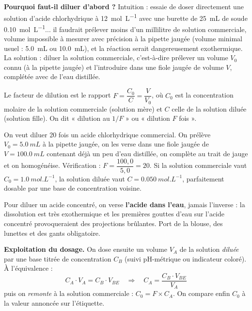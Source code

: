 \documentclass[11pt]{article}
\newcommand{\cle}[1]{{\popxbold\color{popdark}#1}}
\begin{document}
\textbf{Pourquoi faut-il diluer d'abord ?} Intuition : essaie de doser directement une solution d'acide chlorhydrique à \SI{12}{mol.L^{-1}} avec une burette de \SI{25}{mL} de soude \SI{0,10}{mol.L^{-1}}... il faudrait prélever moins d'un millilitre de solution commerciale, volume impossible à mesurer avec précision à la pipette jaugée (volume minimal usuel : \SI{5,0}{mL} ou \SI{10,0}{mL}), et la réaction serait dangereusement exothermique. La solution : \cle{diluer} la solution commerciale, c'est-à-dire prélever un volume $V_0$ connu (à la pipette jaugée) et l'introduire dans une fiole jaugée de volume $V$, complétée avec de l'eau distillée.

\begin{definition}
Le \cle{facteur de dilution} est le rapport $F = \dfrac{C_0}{C} = \dfrac{V}{V_0}$, où $C_0$ est la concentration molaire de la solution commerciale (solution mère) et $C$ celle de la solution diluée (solution fille). On dit « dilution au $1/F$ » ou « dilution $F$ fois ».
\end{definition}

\begin{exemplebox}
On veut diluer 20 fois un acide chlorhydrique commercial. On prélève $V_0 = \SI{5,0}{mL}$ à la pipette jaugée, on les verse dans une fiole jaugée de $V = \SI{100,0}{mL}$ contenant déjà un peu d'eau distillée, on complète au trait de jauge et on homogénéise. Vérification : $F = \dfrac{100,0}{5,0} = 20$. Si la solution commerciale vaut $C_0 = \SI{1,0}{mol.L^{-1}}$, la solution diluée vaut $C = \SI{0,050}{mol.L^{-1}}$, parfaitement dosable par une base de concentration voisine.
\end{exemplebox}

\begin{attention}
Pour diluer un acide concentré, on verse \textbf{l'acide dans l'eau}, jamais l'inverse : la dissolution est très exothermique et les premières gouttes d'eau sur l'acide concentré provoqueraient des projections brûlantes. Port de la blouse, des lunettes et des gants obligatoire.
\end{attention}

\textbf{Exploitation du dosage.} On dose ensuite un volume $V_A$ de la solution \emph{diluée} par une base titrée de concentration $C_B$ (suivi pH-métrique ou indicateur coloré). À l'équivalence :
\[ C_A \cdot V_A = C_B \cdot V_{BE} \quad\Longrightarrow\quad C_A = \frac{C_B \cdot V_{BE}}{V_A} \]
puis on \emph{remonte} à la solution commerciale : $C_0 = F \times C_A$. On compare enfin $C_0$ à la valeur annoncée sur l'étiquette.
\end{document}
